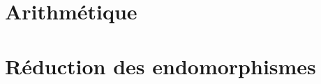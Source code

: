 \documentclass{report}
\begin{document}


\chapter{Arithmétique}



\chapter{Réduction des endomorphismes}










\end{document}
